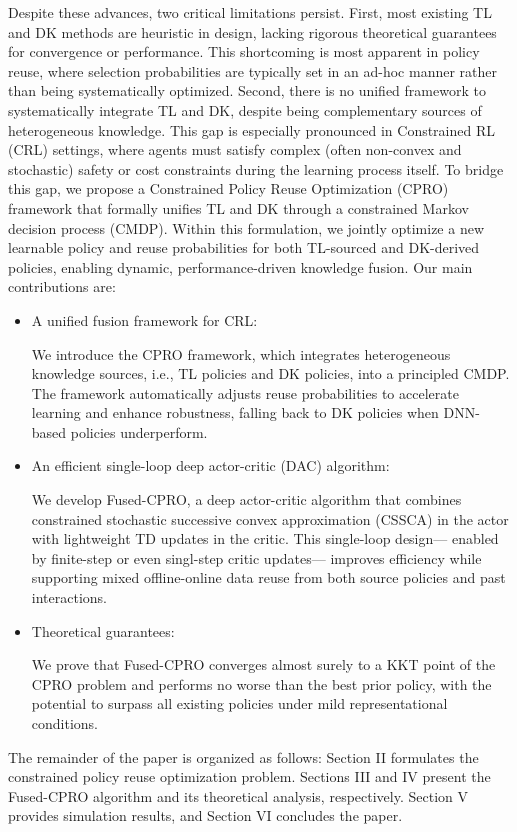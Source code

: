 \documentclass{IEEEtran}
\begin{document}
Despite these advances, two critical limitations persist. First, most existing TL and DK methods are heuristic in design, lacking rigorous theoretical guarantees for convergence or performance. This shortcoming is most apparent in policy reuse, where selection probabilities are typically set in an ad-hoc manner rather than being systematically optimized. Second, there is no unified framework to systematically integrate TL and DK, despite being complementary sources of heterogeneous knowledge. This gap is especially pronounced in Constrained RL (CRL) settings, where agents must satisfy complex (often non-convex and stochastic) safety or cost constraints during the learning process itself. To bridge this gap, we propose a Constrained Policy Reuse Optimization (CPRO) framework that formally unifies TL and DK through a constrained Markov decision process (CMDP). Within this formulation, we jointly optimize a new learnable policy and reuse probabilities for both TL-sourced and DK-derived policies, enabling dynamic, performance-driven knowledge fusion. Our main contributions are:

\begin{itemize}
\item A unified fusion framework for CRL:

We introduce the CPRO framework, which integrates heterogeneous knowledge sources, i.e., TL policies and DK policies, into a principled CMDP. The framework automatically adjusts reuse probabilities to accelerate learning and enhance robustness, falling back to DK policies when DNN-based policies underperform.
\item An efficient single-loop deep actor-critic (DAC) algorithm:

We develop Fused-CPRO, a deep actor-critic algorithm that combines constrained stochastic successive convex approximation (CSSCA) in the actor with lightweight TD updates in the critic. This single-loop design--- enabled by finite-step or even singl-step critic updates--- improves efficiency while supporting mixed offline-online data reuse from both source policies and past interactions.
\item Theoretical guarantees:

We prove that Fused-CPRO converges almost surely to a KKT point of the CPRO problem and performs no worse than the best prior policy, with the potential to surpass all existing policies under mild representational conditions.
\end{itemize}
The remainder of the paper is organized as follows: Section II formulates the constrained policy reuse optimization problem. Sections III and IV present the Fused-CPRO algorithm and its theoretical analysis, respectively. Section V provides simulation results, and Section VI concludes the paper.
\end{document}
